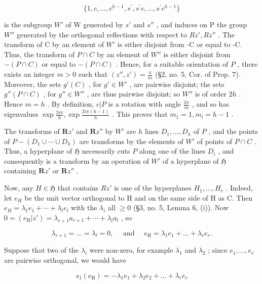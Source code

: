 \[
\{1, c, \dots , c ^ {h - 1}, s ^ {\prime}, s ^ {\prime} c, \dots , s ^ {\prime} c ^ {h - 1} \}
\]

is the subgroup \(W'\) of W generated by \(s'\) and \(s''\) , and induces on P the group \(W''\) generated by the orthogonal reflections with respect to \(Rz', Rz''\) . The transform of C by an element of \(W'\) is either disjoint from -C or equal to -C. Thus, the transform of \(P \cap C\) by an element of \(W''\) is either disjoint from \(-(P \cap C)\) or equal to \(-(P \cap C)\) . Hence, for a suitable orientation of \(P\) , there exists an integer \(m > 0\) such that \((z'', z') = \frac{\pi}{m}\) (§2, no. 5, Cor. of Prop. 7). Moreover, the sets \(g'(C)\) , for \(g' \in W'\) , are pairwise disjoint; the sets \(g''(P \cap C)\) , for \(g'' \in W''\) , are thus pairwise disjoint; so \(W''\) is of order \(2h\) . Hence \(m = h\) . By definition, \(c|P\) is a rotation with angle \(\frac{2\pi}{m}\) , and so has eigenvalues \(\exp \frac{2i\pi}{h}, \exp \frac{2i\pi(h - 1)}{h}\) . This proves that \(m_1 = 1, m_l = h - 1\) .

The transforms of \(\mathbf{R}z'\) and \(\mathbf{R}z''\) by \(W'\) are \(h\) lines \(D_1, \ldots, D_h\) of \(P\) , and the points of \(P - (D_1 \cup \cdots \cup D_h)\) are transforms by the elements of \(W'\) of points of \(P \cap C\) . Thus, a hyperplane of \(\mathfrak{H}\) necessarily cuts \(P\) along one of the lines \(D_i\) , and consequently is a transform by an operation of \(W'\) of a hyperplane of \(\mathfrak{H}\) containing \(\mathbf{R}z'\) or \(\mathbf{R}z''\) .

Now, any \(H \in \mathfrak{H}\) that contains \(Rz'\) is one of the hyperplanes \(H_{1}, \ldots, H_{r}\) . Indeed, let \(e_{H}\) be the unit vector orthogonal to H and on the same side of H as C. Then \(e_{H} = \lambda_{1}e_{1} + \cdots + \lambda_{l}e_{l}\) with the \(\lambda_{i}\) all \(\geqslant 0\) (§3, no. 5, Lemma 6, (i)). Now \(0 = (e_{\mathrm{H}}|z') = \lambda_{r+1}a_{r+1} + \cdots + \lambda_{l}a_{l}\) , so

\[
\lambda_ {r + 1} = \dots = \lambda_ {l} = 0, \quad \text { and } \quad e _ {\mathrm{H}} = \lambda_ {1} e _ {1} + \dots + \lambda_ {r} e _ {r}.
\]

Suppose that two of the \(\lambda_{i}\) were non-zero, for example \(\lambda_{1}\) and \(\lambda_{2}\) ; since \(e_{1},\ldots,e_{r}\) are pairwise orthogonal, we would have

\[
s _ {1} (e _ {\mathrm{H}}) = - \lambda_ {1} e _ {1} + \lambda_ {2} e _ {2} + \dots + \lambda_ {r} e _ {r}
\]

